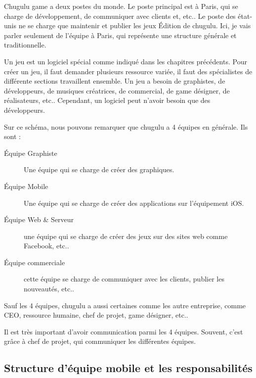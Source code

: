 Chugulu game a deux postes du monde. Le poste principal est à Paris, qui se charge de développement, de communiquer avec clients et, etc.. Le poste des état-unis ne se charge que maintenir et publier les jeux Édition de chugulu. Ici, je vais parler seulement de l'équipe à Paris, qui représente une structure générale et traditionnelle.

Un jeu est un logiciel spécial comme indiqué dans les chapitres précédents. Pour créer un jeu, il faut demander plusieurs ressource variée, il faut des spécialistes de différente sections travaillent ensemble. Un jeu a besoin de graphistes, de développeurs, de musiques créatrices, de commercial, de game désigner, de réalisateurs, etc.. Cependant, un logiciel peut n'avoir besoin que des développeurs.  

Sur ce schéma, nous pouvons remarquer que chugulu a 4 équipes en générale. Ils sont : 
\begin{description}
	\item[Équipe Graphiste] Une équipe qui se charge de créer des graphiques. 
	\item[Équipe Mobile] Une équipe qui se charge de créer des applications sur l'équipement iOS.
	\item[Équipe Web \& Serveur] une équipe qui se charge de créer des jeux sur des sites web comme Facebook, etc..
	\item[Équipe commerciale] cette équipe se charge de communiquer avec les clients, publier les nouveautés, etc..
\end{description}
Sauf les 4 équipes, chugulu a aussi certaines comme les autre entreprise, comme CEO, ressource humaine, chef de projet, game désigner, etc..

Il est très important d'avoir communication parmi les 4 équipes. Souvent, c'est grâce à chef de projet, qui communiquer les différentes équipes. 


\subsection{Structure d'équipe mobile et les responsabilités} %
\label{sub:structure_d_équipe_mobile_et_les_responsabilités}

